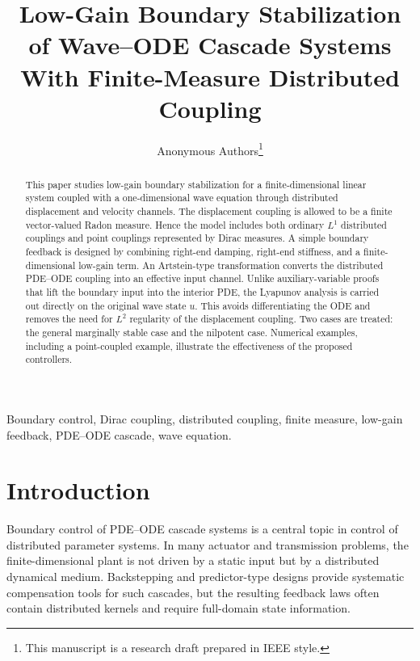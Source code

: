 \documentclass[journal]{IEEEtran}
\begin{document}
\title{Low-Gain Boundary Stabilization of Wave--ODE Cascade Systems With Finite-Measure Distributed Coupling}

\author{Anonymous Authors\thanks{This manuscript is a research draft prepared in IEEE style.}}


\maketitle

\begin{abstract}
This paper studies low-gain boundary stabilization for a finite-dimensional linear system coupled with a one-dimensional wave equation through distributed displacement and velocity channels. The displacement coupling is allowed to be a finite vector-valued Radon measure. Hence the model includes both ordinary $L^1$ distributed couplings and point couplings represented by Dirac measures. A simple boundary feedback is designed by combining right-end damping, right-end stiffness, and a finite-dimensional low-gain term. An Artstein-type transformation converts the distributed PDE--ODE coupling into an effective input channel. Unlike auxiliary-variable proofs that lift the boundary input into the interior PDE, the Lyapunov analysis is carried out directly on the original wave state $u$. This avoids differentiating the ODE and removes the need for $L^2$ regularity of the displacement coupling. Two cases are treated: the general marginally stable case and the nilpotent case. Numerical examples, including a point-coupled example, illustrate the effectiveness of the proposed controllers.
\end{abstract}

\begin{IEEEkeywords}
Boundary control, Dirac coupling, distributed coupling, finite measure, low-gain feedback, PDE--ODE cascade, wave equation.
\end{IEEEkeywords}

\section{Introduction}

Boundary control of PDE--ODE cascade systems is a central topic in control of distributed parameter systems. In many actuator and transmission problems, the finite-dimensional plant is not driven by a static input but by a distributed dynamical medium. Backstepping and predictor-type designs provide systematic compensation tools for such cascades, but the resulting feedback laws often contain distributed kernels and require full-domain state information.
\end{document}
